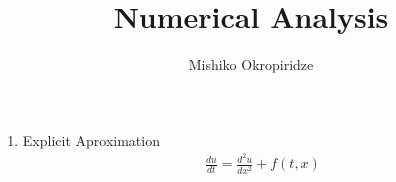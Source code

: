 \documentclass{article}
\author{Mishiko Okropiridze}
\title{Numerical Analysis}
\begin{document}
	
	\begin{enumerate}

		\item Explicit Aproximation
			\begin{align*}
			 \frac{du}{dt} = \frac{d^2u}{dx^2} + f(t, x)
			\end{align*}

	\end{enumerate}
\end{document}
